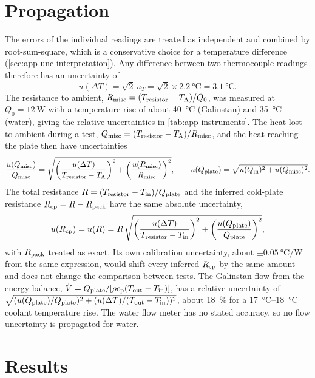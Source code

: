 \section{Propagation}

The errors of the individual readings are treated as independent and combined
by root-sum-square, which is a conservative choice for a temperature
difference (\cref{sec:app-unc-interpretation}). Any difference between two
thermocouple readings therefore has an uncertainty of
\begin{equation}
  u(\Delta T) = \sqrt{2}\,u_T = \sqrt{2} \times \SI{2.2}{\celsius}
    = \SI{3.1}{\celsius}.
\end{equation}
The resistance to ambient, $R_{\mathrm{misc}} = (T_{\mathrm{resistor}} - T_{\mathrm{A}})/Q_0$, was measured
at $Q_0 = \SI{12}{\watt}$ with a temperature rise of about \SI{40}{\celsius}
(Galinstan) and \SI{35}{\celsius} (water), giving the relative uncertainties in
\cref{tab:app-instruments}. The heat lost to ambient during a test,
$Q_{\mathrm{misc}} = (T_{\mathrm{resistor}} - T_{\mathrm{A}})/R_{\mathrm{misc}}$, and the heat reaching the
plate then have uncertainties
\begin{equation}
  \frac{u(Q_{\mathrm{misc}})}{Q_{\mathrm{misc}}}
    = \sqrt{\left(\frac{u(\Delta T)}{T_{\mathrm{resistor}} - T_{\mathrm{A}}}\right)^{2}
      + \left(\frac{u(R_{\mathrm{misc}})}{R_{\mathrm{misc}}}\right)^{2}},
  \qquad
  u(Q_{\mathrm{plate}}) = \sqrt{u(Q_{\mathrm{in}})^{2} + u(Q_{\mathrm{misc}})^{2}}.
\end{equation}
The total resistance $R = (T_{\mathrm{resistor}} - T_{\mathrm{in}})/Q_{\mathrm{plate}}$ and the inferred cold-plate
resistance $R_{\mathrm{cp}} = R - R_{\mathrm{pack}}$ have the same absolute uncertainty,
\begin{equation}
  u(R_{\mathrm{cp}}) = u(R) = R\,\sqrt{\left(\frac{u(\Delta T)}{T_{\mathrm{resistor}} - T_{\mathrm{in}}}\right)^{2}
      + \left(\frac{u(Q_{\mathrm{plate}})}{Q_{\mathrm{plate}}}\right)^{2}},
  \label{eq:app-u-r}
\end{equation}
with $R_{\mathrm{pack}}$ treated as exact. Its own calibration uncertainty, about
$\pm\SI{0.05}{\celsius\per\watt}$ from the same expression, would shift every
inferred $R_{\mathrm{cp}}$ by the same amount and does not change the comparison between
tests. The Galinstan flow from the energy balance,
$\dot{V} = Q_{\mathrm{plate}}/[\rho c_{\mathrm{p}}(T_{\mathrm{out}} - T_{\mathrm{in}})]$, has a relative uncertainty of
$\sqrt{(u(Q_{\mathrm{plate}})/Q_{\mathrm{plate}})^{2} + (u(\Delta T)/(T_{\mathrm{out}} - T_{\mathrm{in}}))^{2}}$, about
\SI{18}{\percent} for a \SIrange{17}{18}{\celsius} coolant temperature rise. The
water flow meter has no stated accuracy, so no flow uncertainty is propagated for
water.

\section{Results}

